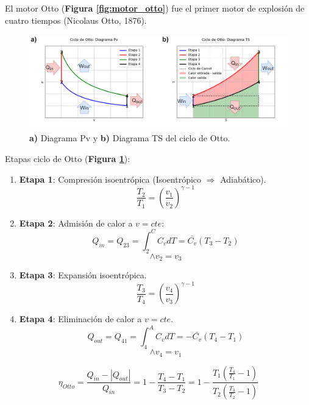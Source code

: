             El motor Otto (\textbf{Figura \ref{fig:motor_otto}}) fue el primer motor de explosión de cuatro tiempos (Nicolaus Otto, 1876).
            
            
            \begin{figure}[H]
                \includegraphics[width=.9\textwidth]{img/ciclos/ciclo_otto.png}
                \caption[Diagramas Ciclos de Otto]{\textbf{a)} Diagrama Pv y \textbf{b)} Diagrama TS del ciclo de Otto.}
                \label{fig:ciclo_otto}
            \end{figure}
            
            Etapas ciclo de Otto (\textbf{Figura \ref{fig:ciclo_otto}}):
            
            \begin{enumerate}
                \item \textbf{Etapa 1}: Compresión isoentrópica (Isoentrópico \(\Rightarrow\) Adiabático).
                \[\frac{T_{2}}{T_{1}}=\left ( \frac{v_{1}}{v_{2}} \right )^{\gamma - 1}\]
    
                \item \textbf{Etapa 2}: Admisión de calor a \(v=cte\):
                \[Q_{in}=Q_{23}=\int_{2}^{C}C_{v}dT=\bar{C_{v}}(T_{3}-T_{2})\]
                \[\wedge v_{2} = v_{3}\]
                
                \item \textbf{Etapa 3}: Expansión isoentrópica.
                \[\frac{T_{3}}{T_{4}}=\left ( \frac{v_{4}}{v_{3}} \right )^{\gamma - 1}\]
                
                \item \textbf{Etapa 4}: Eliminación de calor a \(v=cte\).
                \[Q_{out}=Q_{41}=\int_{4}^{A}C_{v}dT=-\bar{C_{v}}(T_{4}-T_{1})\]
                \[\wedge v_{4} = v_{1}\]
            \end{enumerate}
            \[\eta_{Otto}=\frac{Q_{in}-|Q_{out}|}{Q_{in}}=1-\frac{T_{4}-T_{1}}{T_{3}-T_{2}}=1-\frac{T_{1}\left ( \frac{T_{4}}{T_{1}} - 1\right )}{T_{2}\left ( \frac{T_{3}}{T_{2}} - 1\right )}\]
            
